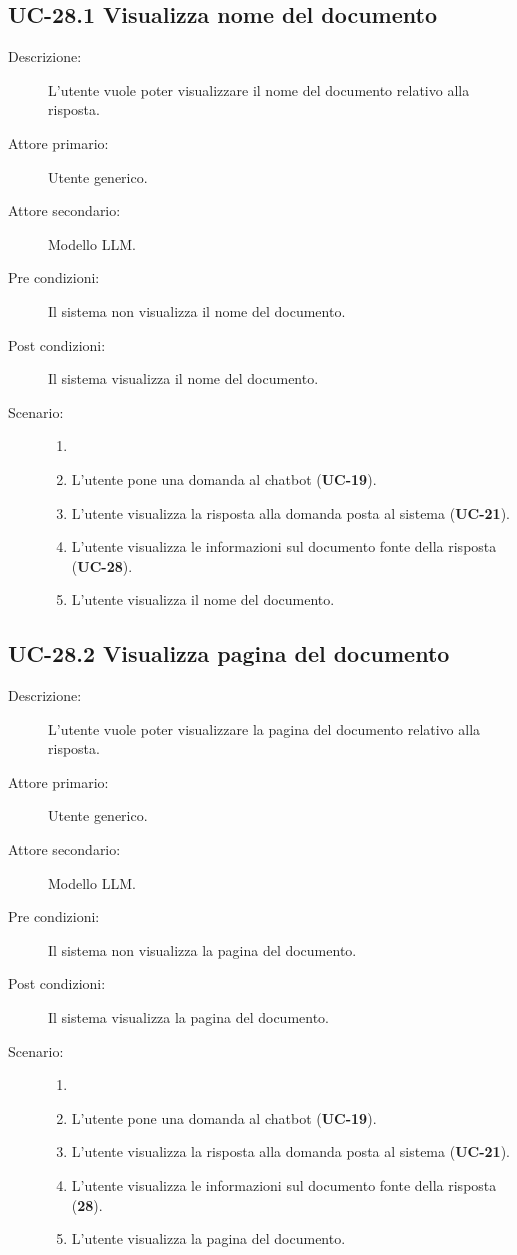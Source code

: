 \subsection{UC-28.1 Visualizza nome del documento}
\begin{description}
    \item[Descrizione:] L'utente vuole poter visualizzare il nome del documento relativo alla risposta.
    \item[Attore primario:] Utente generico.
    \item[Attore secondario:] Modello LLM.
    \item[Pre condizioni:] Il sistema non visualizza il nome del documento.
    \item[Post condizioni:] Il sistema visualizza il nome del documento.
    \item[Scenario:] 
    \begin{enumerate}
        \item[]
        \item L’utente pone una domanda al chatbot (\textbf{UC-19}).
        \item L'utente visualizza la risposta alla domanda posta al sistema (\textbf{UC-21}).
        \item L'utente visualizza le informazioni sul documento fonte della risposta (\textbf{UC-28}).
        \item L'utente visualizza il nome del documento.
    \end{enumerate}
\end{description}

\subsection{UC-28.2 Visualizza pagina del documento}
\begin{description}
    \item[Descrizione:] L'utente vuole poter visualizzare la pagina del documento relativo alla risposta.
    \item[Attore primario:] Utente generico.
    \item[Attore secondario:] Modello LLM.
    \item[Pre condizioni:] Il sistema non visualizza la pagina del documento.
    \item[Post condizioni:] Il sistema visualizza la pagina del documento.
    \item[Scenario:] 
    \begin{enumerate}
        \item[]
        \item L’utente pone una domanda al chatbot (\textbf{UC-19}).
        \item L'utente visualizza la risposta alla domanda posta al sistema (\textbf{UC-21}).
        \item L'utente visualizza le informazioni sul documento fonte della risposta (\textbf{28}).
        \item L'utente visualizza la pagina del documento.
    \end{enumerate}
\end{description}


